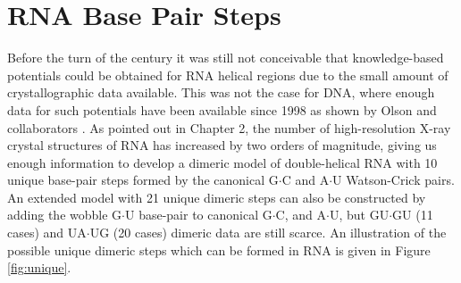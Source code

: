 \chapter{RNA Base Pair Steps}
\label{basepairsteps} 
 
Before  the turn  of the  century it  was still  not  conceivable that
knowledge-based potentials  could be obtained for  RNA helical regions
due to the  small amount of crystallographic data  available. This was
not the case for DNA, where  enough data for such potentials have been
available   since   1998  as   shown   by   Olson  and   collaborators
\cite{olson1998}.   As  pointed  out  in  Chapter  2,  the  number  of
high-resolution X-ray  crystal structures of RNA has  increased by two
orders of magnitude, giving us enough information to develop a dimeric
model of double-helical  RNA with 10 unique base-pair  steps formed by
the canonical G$\cdot$C and  A$\cdot$U Watson-Crick pairs. An extended
model with 21  unique dimeric steps can also  be constructed by adding
the wobble G$\cdot$U base-pair  to canonical G$\cdot$C, and A$\cdot$U,
but GU$\cdot$GU (11 cases) and UA$\cdot$UG (20 cases) dimeric data are
still  scarce. An illustration  of the  possible unique  dimeric steps
which can be formed in RNA is given in Figure \ref{fig:unique}.

